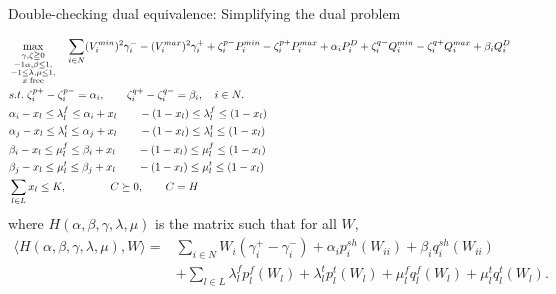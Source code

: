 \documentclass[xcolor=dvipsnames]{beamer}
\newcommand{\ii}{i}
\newcommand{\llll}{l}
\newcommand{\WW}{W}
\begin{document}
\begin{frame}{Double-checking dual equivalence: Simplifying the dual problem}
\begin{tiny}
\begin{subequations}
\begin{align}
&\max_{\substack{\gamma,\zeta \geqq 0 \\ -1 \alpha,\beta \le 1,\\ -1 \le \lambda,\mu \le 1,\\ x\; \text{free}}} \quad 
 \sum_{\ii \in N}  (V_\ii^{min})^2 \gamma_\ii^- - (V_\ii^{max})^2 \gamma_\ii^+ + \zeta_\ii^{p-}P_\ii^{min} - \zeta_\ii^{p+}P_\ii^{max} +\alpha_\ii P_\ii^D 
+ \zeta_\ii^{q-}Q_\ii^{min} - \zeta_\ii^{q+}Q_\ii^{max} + \beta_\ii Q_\ii^D \notag \\
&s.t.\; \zeta_\ii^{p+}-\zeta_\ii^{p-} = \alpha_\ii , \qquad \zeta_\ii^{q+}-\zeta_\ii^{q-} = \beta_\ii,\quad \ii \in N. \notag\\
&  \alpha_i - x_\llll \leq  \lambda_\llll^f \le \alpha_i + x_\llll   \qquad -(1- x_\llll) \leq \lambda_l^f  \le (1-x_\llll) \notag\\
&  \alpha_j  -x_\llll \leq \lambda_\llll^t \le \alpha_j + x_\llll  \qquad -(1-x_l) \le \lambda_\llll^t \le (1-x_l) \notag\\
&\beta_i  - x_\llll \leq \mu_\llll^f \le \beta_i + x_l \qquad -(1-x_l) \le \mu_\llll^f \le (1- x_l) \notag\\
&\beta_j  -  x_\llll \leq \mu_\llll^t \le \beta_j + x_l \qquad  -(1-x_l) \le \mu_\llll^t \le (1-x_l)  \notag \\
& \sum_{l \in L} x_l \le K, \qquad\qquad C \succeq 0\notag, \qquad C = H \\
\end{align}
\end{subequations}
where $H(\alpha,\beta,\gamma,\lambda,\mu)$ is the matrix such that for all $\WW$, 
\begin{align*}
\langle H(\alpha,\beta,\gamma,\lambda,\mu), W \rangle = &\sum_{\ii \in N} W_\ii(\gamma_\ii^+-\gamma_\ii^-) + \alpha_\ii p_\ii^{sh}(\WW_{ii}) + \beta_\ii q_\ii^{sh}(\WW_{ii}) \\
&+ \sum_{l \in L} \lambda_l^f p_l^f(\WW_l) + \lambda_l^t p_l^t(\WW_l) + \mu_l^f q_l^f(\WW_l) + \mu_l^t q_l^t(\WW_l).
\end{align*}
\end{tiny}
\end{frame}
\end{document}
